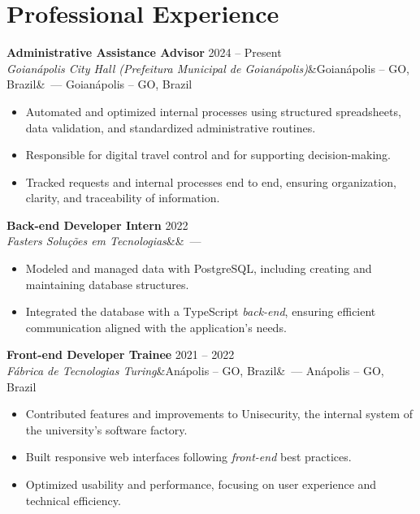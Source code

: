 \documentclass[10.5pt,a4paper]{article}
\newcommand{\entry}[4]{%
  \textbf{#1} \hfill #4\\
  \textit{#2}\ifx&#3&\else\ --- #3\fi\par\vspace{1pt}}
\begin{document}
\section{Professional Experience}
\entry{Administrative Assistance Advisor}{Goianápolis City Hall (Prefeitura Municipal de Goianápolis)}{Goianápolis -- GO, Brazil}{2024 -- Present}
\begin{itemize}
  \item Automated and optimized internal processes using structured spreadsheets, data validation, and standardized administrative routines.
  \item Responsible for digital travel control and for supporting decision-making.
  \item Tracked requests and internal processes end to end, ensuring organization, clarity, and traceability of information.
\end{itemize}

\vspace{3pt}
\entry{Back-end Developer Intern}{Fasters Soluções em Tecnologias}{}{2022}
\begin{itemize}
  \item Modeled and managed data with PostgreSQL, including creating and maintaining database structures.
  \item Integrated the database with a TypeScript \textit{back-end}, ensuring efficient communication aligned with the application's needs.
\end{itemize}

\vspace{3pt}
\entry{Front-end Developer Trainee}{Fábrica de Tecnologias Turing}{Anápolis -- GO, Brazil}{2021 -- 2022}
\begin{itemize}
  \item Contributed features and improvements to Unisecurity, the internal system of the university's software factory.
  \item Built responsive web interfaces following \textit{front-end} best practices.
  \item Optimized usability and performance, focusing on user experience and technical efficiency.
\end{itemize}
\end{document}
